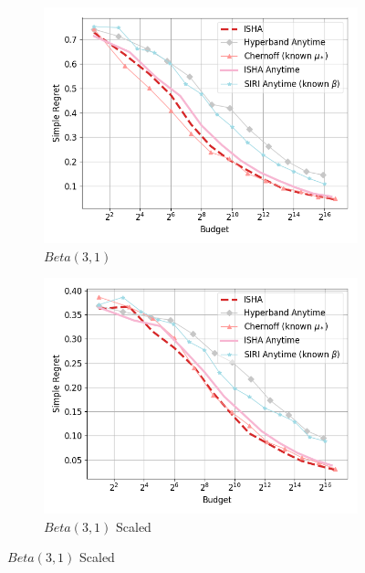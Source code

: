 \begin{figure}
\begin{subfigure}{0.4\textwidth}
	\includegraphics[width=\textwidth]{fixedbudget/figures/folder3/alpha1_beta3_unscaled.png}
	\caption{$Beta(3,1)$}
	\label{appendix:fig:sh-anytime:alpha1_beta3_unscaled}
\end{subfigure}
\quad
\begin{subfigure}{0.4\textwidth}
	\includegraphics[width=\textwidth]{fixedbudget/figures/folder3/alpha1_beta3_scaled.png}
	\caption{$Beta(3,1)$ Scaled}
	\label{appendix:fig:sh-anytime:alpha1_beta3_scaled}
\end{subfigure}
%
\label{appendix:fig:sh-anytime}
\end{figure}

